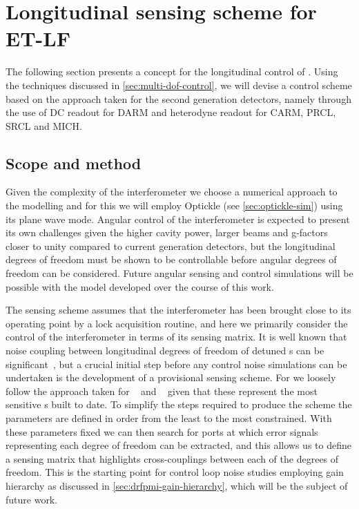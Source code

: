 \section{Longitudinal sensing scheme for ET-LF}
The following section presents a concept for the longitudinal control of \ETLF{}. Using the techniques discussed in \cref{sec:multi-dof-control}, we will devise a control scheme based on the approach taken for the second generation detectors, namely through the use of \gls{DC} readout for \gls{DARM} and heterodyne readout for \gls{CARM}, \gls{PRCL}, \gls{SRCL} and \gls{MICH}.

\subsection{Scope and method}
Given the complexity of the interferometer we choose a numerical approach to the modelling and for this we will employ Optickle (see \cref{sec:optickle-sim}) using its plane wave mode. Angular control of the interferometer is expected to present its own challenges given the higher cavity power, larger beams and g-factors closer to unity compared to current generation detectors, but the longitudinal degrees of freedom must be shown to be controllable before angular degrees of freedom can be considered. Future angular sensing and control simulations will be possible with the model developed over the course of this work.

The sensing scheme assumes that the interferometer has been brought close to its operating point by a lock acquisition routine, and here we primarily consider the control of the interferometer in terms of its sensing matrix. It is well known that noise coupling between longitudinal degrees of freedom of detuned \DRFPMI{}s can be significant~\cite{Hild2007}, but a crucial initial step before any control noise simulations can be undertaken is the development of a provisional sensing scheme. For \ETLF{} we loosely follow the approach taken for \ALIGO{}~\cite{Abbott2010} and \AVIRGO{}~\cite{Vajente2008} given that these represent the most sensitive \DRFPMI{}s built to date. To simplify the steps required to produce the scheme the parameters are defined in order from the least to the most constrained. With these parameters fixed we can then search for ports at which error signals representing each degree of freedom can be extracted, and this allows us to define a sensing matrix that highlights cross-couplings between each of the degrees of freedom. This is the starting point for control loop noise studies employing gain hierarchy as discussed in \cref{sec:drfpmi-gain-hierarchy}, which will be the subject of future work.

